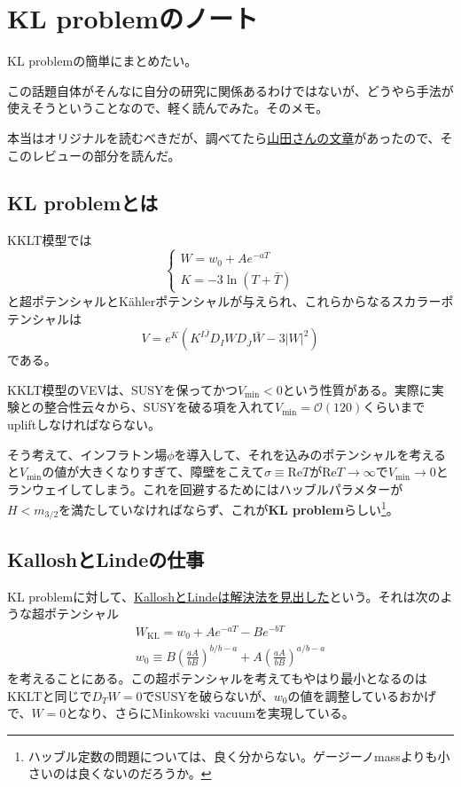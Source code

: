 \documentclass[unicode,a4paper,10pt]{ltjsarticle}
\begin{document}
\maketitle

\section*{KL problemのノート}

KL problemの簡単にまとめたい。

この話題自体がそんなに自分の研究に関係あるわけではないが、どうやら手法が使えそうということなので、軽く読んでみた。そのメモ。

本当はオリジナルを読むべきだが、調べてたら\href{https://doi.org/10.48550/arXiv.1211.1455}{山田さんの文章}があったので、そこのレビューの部分を読んだ。


\subsection*{KL problemとは} 

KKLT模型では
$$
    \begin{cases}
        W
        =
        w_{0}+Ae^{-aT}
        \\
        K
        =
        -3\ln(T+\bar{T})
    \end{cases}
$$
と超ポテンシャルとKählerポテンシャルが与えられ、これらからなるスカラーポテンシャルは
$$
    V
    =
    e^{K}(K^{I\bar{J}}D_{I}WD_{\bar{J}}\bar{W}-3|W|^2)
$$
である。

KKLT模型のVEVは、SUSYを保ってかつ$V_{\mathrm{min}}<0$という性質がある。実際に実験との整合性云々から、SUSYを破る項を入れて$V_{\mathrm{min}}=\mathcal{O}(120)$くらいまでupliftしなければならない。

そう考えて、インフラトン場$\phi$を導入して、それを込みのポテンシャルを考えると$V_{\mathrm{min}}$の値が大きくなりすぎて、障壁をこえて$\sigma\equiv\mathrm{Re}T$が$\mathrm{Re}T\rightarrow\infty$で$V_{\mathrm{min}}\rightarrow0$とランウェイしてしまう。これを回避するためにはハッブルパラメターが$H<m_{3/2}$を満たしていなければならず、これが\textbf{KL problem}らしい\footnote{
  ハッブル定数の問題については、良く分からない。ゲージーノmassよりも小さいのは良くないのだろうか。
}。

\subsection*{KalloshとLindeの仕事}

KL problemに対して、\href{https://arxiv.org/abs/hep-th/0411011}{KalloshとLindeは解決法を見出した}という。それは次のような超ポテンシャル
\begin{gather*}
    W_{\mathrm{KL}}
    =
    w_{0}
    +
    Ae^{-aT}
    -
    Be^{-bT}
    \\
    w_{0}
    \equiv
    B\left(\frac{aA}{bB}\right)^{b/b-a}
    +
    A\left(\frac{aA}{bB}\right)^{a/b-a}
\end{gather*}
を考えることにある。この超ポテンシャルを考えてもやはり最小となるのはKKLTと同じで$D_{T}W=0$でSUSYを破らないが、$w_{0}$の値を調整しているおかげで、$W=0$となり、さらにMinkowski vacuumを実現している。
\end{document}
